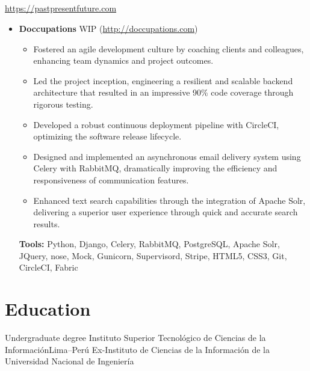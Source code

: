 \documentclass[11pt,a4paper,english]{moderncv}
\begin{document}
\subsection{}

{
\url{https://pastpresentfuture.com}
\newline{}
\begin{itemize}
    \item \textbf{Doccupations}
        \newline{}
        WIP (\url{http://doccupations.com})
        \begin{itemize}
            \item Fostered an agile development culture by coaching clients and colleagues, enhancing team dynamics and project outcomes.
            \item Led the project inception, engineering a resilient and scalable backend architecture that resulted in an impressive 90\% code coverage through rigorous testing.
            \item Developed a robust continuous deployment pipeline with CircleCI, optimizing the software release lifecycle.
            \item Designed and implemented an asynchronous email delivery system using Celery with RabbitMQ, dramatically improving the efficiency and responsiveness of communication features.
            \item Enhanced text search capabilities through the integration of Apache Solr, delivering a superior user experience through quick and accurate search results.
        \end{itemize}
        \textbf{Tools:} Python, Django, Celery, RabbitMQ, PostgreSQL, Apache Solr, JQuery, nose, Mock, Gunicorn, Supervisord, Stripe, HTML5, CSS3, Git, CircleCI, Fabric
\end{itemize}
}

\subsection{}

\section{Education}
    {Undergraduate degree}
    {Instituto Superior Tecnológico de Ciencias de la Información}{Lima--Perú}
    {}{Ex-Instituto de Ciencias de la Información de la Universidad Nacional de Ingeniería}
\end{document}
